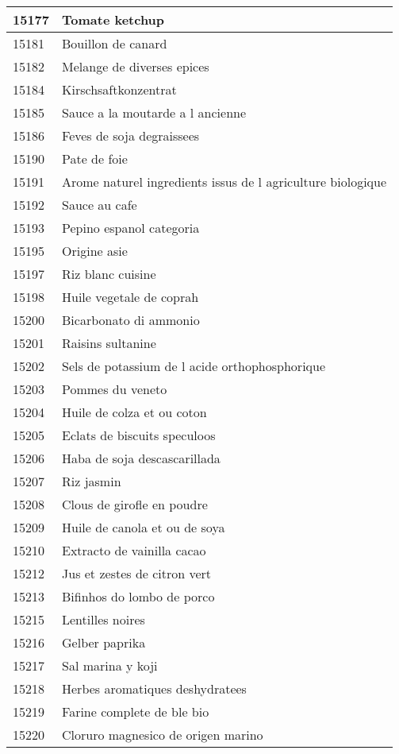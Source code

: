 \begin{longtable}{|l|l|}
15177 & Tomate ketchup \\ \hline 
15181 & Bouillon de canard \\ \hline 
15182 & Melange de diverses epices \\ \hline 
15184 & Kirschsaftkonzentrat \\ \hline 
15185 & Sauce a la moutarde a l ancienne \\ \hline 
15186 & Feves de soja degraissees \\ \hline 
15190 & Pate de foie \\ \hline 
15191 & Arome naturel ingredients issus de l agriculture biologique \\ \hline 
15192 & Sauce au cafe \\ \hline 
15193 & Pepino espanol categoria \\ \hline 
15195 & Origine asie \\ \hline 
15197 & Riz blanc cuisine \\ \hline 
15198 & Huile vegetale de coprah \\ \hline 
15200 & Bicarbonato di ammonio \\ \hline 
15201 & Raisins sultanine \\ \hline 
15202 & Sels de potassium de l acide orthophosphorique \\ \hline 
15203 & Pommes du veneto \\ \hline 
15204 & Huile de colza et ou coton \\ \hline 
15205 & Eclats de biscuits speculoos \\ \hline 
15206 & Haba de soja descascarillada \\ \hline 
15207 & Riz jasmin \\ \hline 
15208 & Clous de girofle en poudre \\ \hline 
15209 & Huile de canola et ou de soya \\ \hline 
15210 & Extracto de vainilla cacao \\ \hline 
15212 & Jus et zestes de citron vert \\ \hline 
15213 & Bifinhos do lombo de porco \\ \hline 
15215 & Lentilles noires \\ \hline 
15216 & Gelber paprika \\ \hline 
15217 & Sal marina y koji \\ \hline 
15218 & Herbes aromatiques deshydratees \\ \hline 
15219 & Farine complete de ble bio \\ \hline 
15220 & Cloruro magnesico de origen marino \\ \hline 

\end{longtable}
